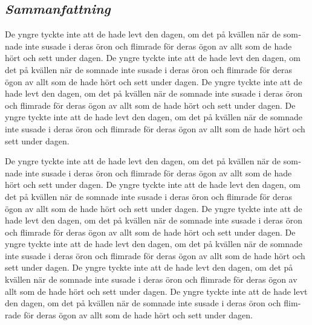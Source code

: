 \documentclass{UUThesisTemplate}
\begin{document}
\begin{swedish}
\chapter*{\emph{Sammanfattning}}
\par De yngre tyckte inte att de hade levt den dagen, om det på kvällen när de somnade inte susade i deras öron och flimrade för deras ögon av allt som de hade hört och sett under dagen. De yngre tyckte inte att de hade levt den dagen, om det på kvällen när de somnade inte susade i deras öron och flimrade för deras ögon av allt som de hade hört och sett under dagen. De yngre tyckte inte att de hade levt den dagen, om det på kvällen när de somnade inte susade i deras öron och flimrade för deras ögon av allt som de hade hört och sett under dagen. De yngre tyckte inte att de hade levt den dagen, om det på kvällen när de somnade inte susade i deras öron och flimrade för deras ögon av allt som de hade hört och sett under dagen.
\par De yngre tyckte inte att de hade levt den dagen, om det på kvällen när de somnade inte susade i deras öron och flimrade för deras ögon av allt som de hade hört och sett under dagen. De yngre tyckte inte att de hade levt den dagen, om det på kvällen när de somnade inte susade i deras öron och flimrade för deras ögon av allt som de hade hört och sett under dagen. De yngre tyckte inte att de hade levt den dagen, om det på kvällen när de somnade inte susade i deras öron och flimrade för deras ögon av allt som de hade hört och sett under dagen. De yngre tyckte inte att de hade levt den dagen, om det på kvällen när de somnade inte susade i deras öron och flimrade för deras ögon av allt som de hade hört och sett under dagen. De yngre tyckte inte att de hade levt den dagen, om det på kvällen när de somnade inte susade i deras öron och flimrade för deras ögon av allt som de hade hört och sett under dagen. De yngre tyckte inte att de hade levt den dagen, om det på kvällen när de somnade inte susade i deras öron och flimrade för deras ögon av allt som de hade hört och sett under dagen.
\end{swedish}
\end{document}
